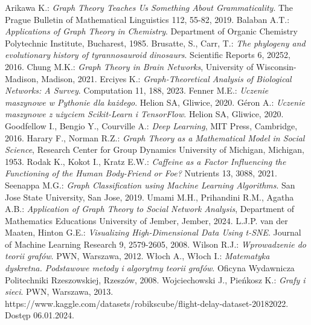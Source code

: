 
\begin{thebibliography}{4}
     Arikawa K.: \textit{Graph Theory Teaches Us Something About Grammaticality}. The Prague Bulletin of Mathematical Linguistics 112, 55-82, 2019.
     Balaban A.T.: \textit{Applications of Graph Theory in Chemistry}. Department of Organic Chemistry Polytechnic Institute, Bucharest, 1985.
     Brusatte, S., Carr, T.: \textit{The phylogeny and evolutionary history of tyrannosauroid dinosaurs}. Scientific Reports 6, 20252, 2016.
     Chung M.K.: \textit{Graph Theory in Brain Networks}, University of Wisconsin-Madison, Madison, 2021.
     Erciyes K.: \textit{Graph-Theoretical Analysis of Biological Networks: A Survey}. Computation 11, 188, 2023.
     Fenner M.E.: \textit{Uczenie maszynowe w Pythonie dla każdego}. Helion SA, Gliwice, 2020.
     Géron A.: \textit{Uczenie maszynowe z użyciem Scikit-Learn i TensorFlow}. Helion SA, Gliwice, 2020.
     Goodfellow I., Bengio Y., Courville A.: \textit{Deep Learning}, MIT Press, Cambridge, 2016.
     Harary F., Norman R.Z.: \textit{Graph Theory as a Mathematical Model in Social Science}, Research Center for Group Dynamics University of Michigan, Michigan, 1953.
     Rodak K., Kokot I., Kratz E.W.: \textit{Caffeine as a Factor Influencing the Functioning of the Human Body-Friend or Foe?} Nutrients 13, 3088, 2021.
     Seenappa M.G.: \textit{Graph Classification using Machine Learning Algorithms}. San Jose State University, San Jose, 2019.
     Umami M.H., Prihandini R.M., Agatha A.B.: \textit{Application of Graph Theory to Social Network Analysis}, Department of Mathematics Educations University of Jember, Jember, 2024.
     L.J.P. van der Maaten, Hinton G.E.: \textit{Visualizing High-Dimensional Data Using t-SNE}. Journal of Machine Learning Research 9, 2579-2605, 2008.
     Wilson R.J.: \textit{Wprowadzenie do teorii grafów}. PWN, Warszawa, 2012.
     Włoch A., Włoch I.: \textit{Matematyka dyskretna. Podstawowe metody i algorytmy teorii grafów}. Oficyna Wydawnicza Politechniki Rzeszowskiej, Rzeszów, 2008.
     Wojciechowski J., Pieńkosz K.: \textit{Grafy i sieci}. PWN, Warszawa, 2013.
     https://www.kaggle.com/datasets/robikscube/flight-delay-dataset-20182022. Dostęp 06.01.2024.

\end{thebibliography}
